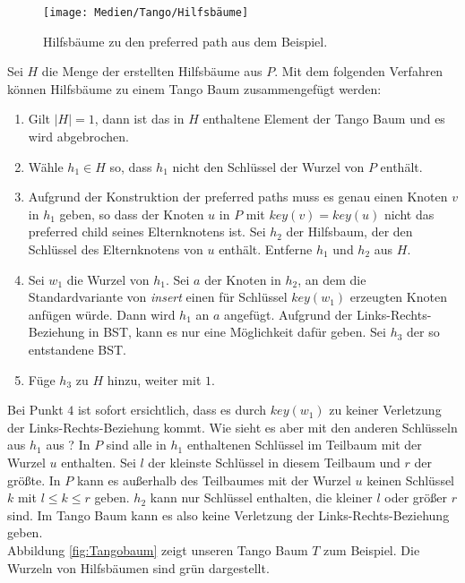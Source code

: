 \documentclass[a4paper,12pt]{article}
\begin{document}
\begin{figure}[H]
	\centering
	\texttt{[image: Medien/Tango/Hilfsbäume]}
	\caption{Hilfsbäume zu den preferred path aus dem Beispiel. }
	\label{fig:Hilfsbäume}
\end{figure}
\noindent Sei $H$ die Menge der erstellten Hilfsbäume aus $P$. Mit dem folgenden Verfahren können Hilfsbäume zu einem Tango Baum zusammengefügt werden:
\begin{enumerate}
	\item Gilt $\vert H \vert = 1$, dann ist das in $H$ enthaltene Element der Tango Baum und es wird abgebrochen.
	\item Wähle $h_1 \in H$ so, dass $h_1$ nicht den Schlüssel der Wurzel von $P$ enthält.
	\item Aufgrund der Konstruktion der preferred paths muss es genau einen Knoten $v$ in $h_1$ geben, so dass der Knoten $u$ in $P$ mit $\mathit{key}\left(v\right) = \mathit{key}\left(u\right) $ nicht das preferred child seines Elternknotens ist.
	Sei $h_2$ der Hilfsbaum, der den Schlüssel des Elternknotens von $u$ enthält. Entferne $h_1$ und $h_2$ aus $H$.
	\item Sei $w_1$ die Wurzel von $h_1$. Sei $a$ der Knoten in $h_2$, an dem die Standardvariante von \textit{insert} einen für Schlüssel  $\mathit{key\left(w_1\right)}$ erzeugten Knoten anfügen würde. Dann wird $h_1$ an $a$ angefügt. Aufgrund der Links-Rechts-Beziehung in BST, kann es nur eine Möglichkeit dafür geben. Sei $h_3$ der so entstandene BST.
	\item Füge $h_3$ zu $H$ hinzu, weiter mit $1$.
\end{enumerate}

\noindent Bei Punkt $4$ ist sofort ersichtlich, dass es durch $\mathit{key}\left(w_1\right)$ zu keiner Verletzung der Links-Rechts-Beziehung kommt. Wie sieht es aber mit den anderen Schlüsseln aus $h_1$ aus ? 
In $P$ sind alle in $h_1$ enthaltenen Schlüssel im Teilbaum mit der Wurzel $u$ enthalten. Sei $l$ der kleinste Schlüssel in diesem Teilbaum und $r$ der größte. In $P$ kann es außerhalb des Teilbaumes mit der Wurzel $u$ keinen Schlüssel $k$ mit $l \leq k \leq r$ geben. $h_2$ kann nur Schlüssel enthalten, die kleiner $l$ oder größer $r$ sind. Im Tango Baum kann es also keine Verletzung der Links-Rechts-Beziehung geben.\\


\noindent Abbildung \ref{fig:Tangobaum} zeigt unseren Tango Baum $T$ zum Beispiel. Die Wurzeln von Hilfsbäumen sind grün dargestellt.
\end{document}
